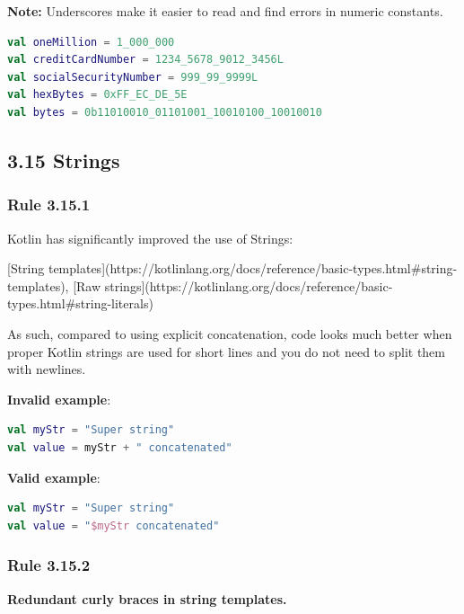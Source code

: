 {{{{\textbf{Note:} Underscores make it easier to read and find errors in numeric constants.

\begin{lstlisting}[language=Kotlin]
val oneMillion = 1_000_000
val creditCardNumber = 1234_5678_9012_3456L
val socialSecurityNumber = 999_99_9999L
val hexBytes = 0xFF_EC_DE_5E
val bytes = 0b11010010_01101001_10010100_10010010
\end{lstlisting}


\subsection*{\textbf{3.15 Strings}}

\subsubsection*{\textbf{Rule 3.15.1}}
\leavevmode\newline

Kotlin has significantly improved the use of Strings:

[String templates](https://kotlinlang.org/docs/reference/basic-types.html\#string-templates), [Raw strings](https://kotlinlang.org/docs/reference/basic-types.html\#string-literals)

As such, compared to using explicit concatenation, code looks much better when proper Kotlin strings are used for short lines and you do not need to split them with newlines.



\textbf{Invalid example}:

\begin{lstlisting}[language=Kotlin]
val myStr = "Super string"
val value = myStr + " concatenated"
\end{lstlisting}


\textbf{Valid example}:

\begin{lstlisting}[language=Kotlin]
val myStr = "Super string"
val value = "$myStr concatenated"
\end{lstlisting}


\subsubsection*{\textbf{Rule 3.15.2}}
\leavevmode\newline

\textbf{Redundant curly braces in string templates.}



}}}}

